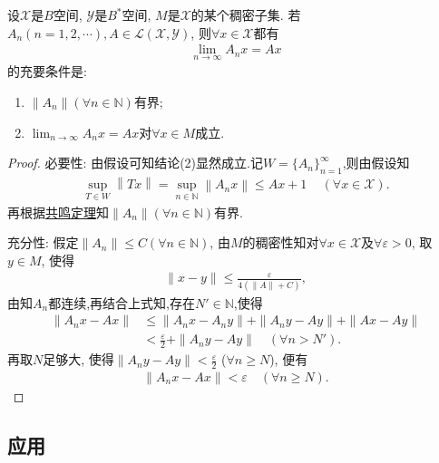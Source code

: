 \documentclass[../../main.tex]{subfiles}%
\begin{document}
\begin{theorem}\label{theorem:泛函分析--Banach-Steinhaus定理}
设$\mathscr{X}$是$B$空间, $\mathscr{Y}$是$B^*$空间, $M$是$\mathscr{X}$的某个稠密子集. 若$A_n(n=1,2,\cdots),A\in\mathscr{L}(\mathscr{X},\mathscr{Y})$, 则$\forall x\in\mathscr{X}$都有
\begin{align*}
\lim_{n\to\infty}A_nx = Ax
\end{align*}
的充要条件是:
\begin{enumerate}[(1)]
\item $\|A_n\|(\forall n\in \mathbb{N})$有界;
\item $\lim_{n\to\infty}A_nx = Ax$对$\forall x\in M$成立.
\end{enumerate}
\end{theorem}
\begin{proof}

{\heiti 必要性:} 由假设可知结论(2)显然成立.记$W=\{A_n\}_{n=1}^{\infty}$,则由假设知
\begin{align*}
\mathop {\mathrm{sup}} \limits_{T\in W}\left\| Tx \right\| =\mathop {\mathrm{sup}} \limits_{n\in \mathbb{N}}\left\| A_nx \right\| \leqslant Ax+1\,\quad (\forall x\in \mathscr{X} ).
\end{align*}
再根据\hyperref[theorem:泛函分析--共鸣定理]{共鸣定理}知$\|A_n\|(\forall n\in \mathbb{N})$有界.

{\heiti 充分性:} 假定$\|A_n\|\leqslant C(\forall n\in\mathbb{N})$, 由$M$的稠密性知对$\forall x\in\mathscr{X}$及$\forall\varepsilon>0$, 取$y\in M$, 使得
\begin{align*}
\|x - y\| \leqslant \frac{\varepsilon}{4(\|A\| + C)},
\end{align*}
由知$A_n$都连续,再结合上式知,存在$N'\in \mathbb{N}$,使得
\begin{align*}
\|A_nx - Ax\| &\leqslant \|A_nx - A_ny\| + \|A_ny - Ay\| + \|Ax - Ay\| \\
&< \frac{\varepsilon}{2} + \|A_ny - Ay\| \quad (\forall n>N').
\end{align*}
再取$N$足够大, 使得$\|A_ny - Ay\| < \frac{\varepsilon}{2}$ ($\forall n\geqslant N$), 便有
\begin{align*}
\|A_nx - Ax\| < \varepsilon \quad (\forall n\geqslant N).
\end{align*}
\end{proof}


\subsection{应用}
\end{document}
